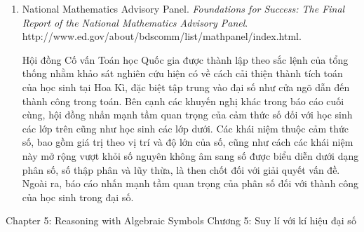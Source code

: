 {{\begin{enumerate}
          \par\noindent\hspace*{1em} Bài tổng quan nghiên cứu về ước lượng toán học và cảm thức số này thảo luận ba mảng liên quan: ước lượng tính toán, ước lượng đo lường và cảm thức số. Chương này lập luận về tầm quan trọng của khả năng ước lượng ở cả trẻ em trong độ tuổi đi học lẫn người lớn, cả trong và ngoài nhà trường. Hiểu sâu về số, bao gồm hiểu độ lớn và so sánh số, cùng với khả năng suy lí về số, là điều thiết yếu để trở thành người ước lượng tốt.\vspace{2.35\baselineskip}

        \item National Mathematics Advisory Panel. \emph{Foundations for Success: The Final Report of the National Mathematics Advisory Panel}. http://www.ed.gov/about/bdscomm/list/mathpanel/index.html.\vspace{.25\baselineskip}

          \par\noindent\hspace*{1em} Hội đồng Cố vấn Toán học Quốc gia được thành lập theo sắc lệnh của tổng thống nhằm khảo sát nghiên cứu hiện có về cách cải thiện thành tích toán của học sinh tại Hoa Kì, đặc biệt tập trung vào đại số như cửa ngõ dẫn đến thành công trong toán. Bên cạnh các khuyến nghị khác trong báo cáo cuối cùng, hội đồng nhấn mạnh tầm quan trọng của cảm thức số đối với học sinh các lớp trên cũng như học sinh các lớp dưới. Các khái niệm thuộc cảm thức số, bao gồm giá trị theo vị trí và độ lớn của số, cũng như cách các khái niệm này mở rộng vượt khỏi số nguyên không âm sang số được biểu diễn dưới dạng phân số, số thập phân và lũy thừa, là then chốt đối với giải quyết vấn đề. Ngoài ra, báo cáo nhấn mạnh tầm quan trọng của phân số đối với thành công của học sinh trong đại số.
      \end{enumerate}}
  }{\NOTE{}}

\ParallelSection
  {Chapter 5: Reasoning with Algebraic Symbols}
  {Chương 5: Suy lí với kí hiệu đại số}
  {}

